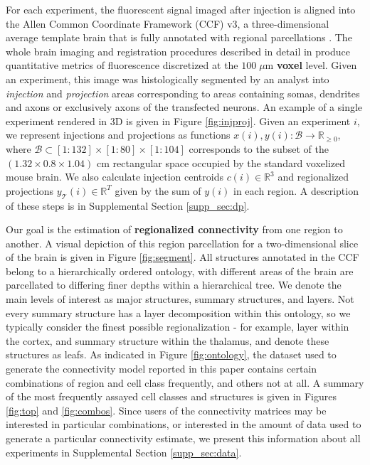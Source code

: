 For each experiment, the fluorescent signal imaged after injection is aligned into the Allen Common Coordinate Framework (CCF) v3, a three-dimensional average template brain that is fully annotated with regional parcellations \cite{Wang2020-po}.
The whole brain imaging and registration procedures described in detail in \citet{Oh2014-kh, Kuan2015-zz} produce quantitative metrics of fluorescence discretized at the $100 \; \mu$m \textbf{voxel} level. 
Given an experiment, this image was histologically segmented by an analyst into \textit{injection} and \textit{projection} areas corresponding to areas containing somas, dendrites and axons or exclusively axons of the transfected neurons.
An example of a single experiment rendered in 3D is given in Figure \ref{fig:injproj}.
Given an experiment $i$, we represent injections and projections as functions $x(i),y(i) : \mathcal B \to \mathbb R_{\geq 0}$, where $\mathcal B \subset [1:132] \times [1:80] \times [1:104]$ corresponds to the subset of the $(1.32 \times 0.8 \times 1.04)$ cm rectangular space occupied by the standard voxelized mouse brain.
We also calculate injection centroids $c(i) \in \mathbb R^3$ and regionalized projections $y_{\mathcal T} (i) \in \mathbb R^{T} $ given by the sum of $y(i)$ in each region.
A description of these steps is in Supplemental Section \ref{supp_sec:dp}.

Our goal is the estimation of \textbf{regionalized connectivity} from one region to another.
A visual depiction of this region parcellation for a two-dimensional slice of the brain is given in Figure \ref{fig:segment}.
All structures annotated in the CCF belong to a hierarchically ordered ontology, with different areas of the brain are parcellated to differing finer depths within a hierarchical tree.
We denote the main levels of interest as major structures, summary structures, and layers.
Not every summary structure has a layer decomposition within this ontology, so we typically consider the finest possible regionalization - for example, layer within the cortex, and summary structure within the thalamus, and denote these structures as leafs.
As indicated in Figure \ref{fig:ontology}, the dataset used to generate the connectivity model reported in this paper contains certain combinations of region and cell class frequently, and others not at all.
A summary of the most frequently assayed cell classes and structures is given in Figures \ref{fig:top} and \ref{fig:combos}.
Since users of the connectivity matrices may be interested in particular combinations, or interested in the amount of data used to generate a particular connectivity estimate, we present this information about all experiments in Supplemental Section \ref*{supp_sec:data}.

